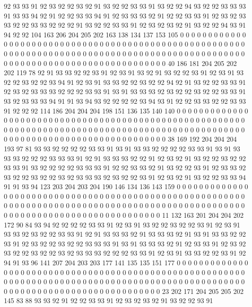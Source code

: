 92 93 93 91 92 93 92 92 93 92 91 93 92 92 93 93 91 93 92 92
94 93 92 92 93 93 93 91 93 93 94 92 91 92 92 93 93 94 91 92
93 93 93 92 91 92 92 93 93 91 92 93 92 93 93 92 92 93 93 92
92 92 91 93 92 92 93 93 91 92 93 92 93 92 91 93 92 92 94 93
91 94 92 92 104 163 206 204 205 202 163 138 134 137 153 105 0 0 0 0
0 0 0 0 0 0 0 0 0 0 0 0 0 0 0 0 0 0 0 0
0 0 0 0 0 0 0 0 0 0 0 0 0 0 0 0 0 0 0 0
0 0 0 0 0 0 0 0 0 0 0 0 0 0 0 0 0 0 0 0
0 0 0 0 0 0 0 0 0 0 0 0 0 0 0 0 0 0 0 0
0 0 0 0 0 0 0 0 0 0 0 0 0 0 0 0 0 0 0 0
0 0 0 0 0 0 0 0 0 0 0 0 0 0 0 0 0 0 0 0
0 0 0 40 186 181 204 205 202 202 119 78 92 91 93 93 92 92 93 91
92 93 91 93 92 91 93 92 92 93 91 92 93 91 93 92 92 93 92 92
93 94 91 92 93 91 93 93 92 92 93 92 92 94 92 91 93 92 92 93
93 91 92 93 92 93 93 93 92 92 92 93 93 91 93 91 93 93 93 92
93 92 92 93 92 92 93 93 91 93 92 93 93 93 94 91 91 93 94 93
92 92 92 92 93 94 93 91 92 92 93 93 92 92 93 93 91 92 92 92
114 186 204 204 204 198 151 136 135 140 140 0 0 0 0 0 0 0 0 0
0 0 0 0 0 0 0 0 0 0 0 0 0 0 0 0 0 0 0 0
0 0 0 0 0 0 0 0 0 0 0 0 0 0 0 0 0 0 0 0
0 0 0 0 0 0 0 0 0 0 0 0 0 0 0 0 0 0 0 0
0 0 0 0 0 0 0 0 0 0 0 0 0 0 0 0 0 0 0 0
0 0 0 0 0 0 0 0 0 0 0 0 0 0 0 0 0 0 0 0
0 0 0 0 0 0 0 0 0 0 0 0 0 0 0 0 0 0 0 38
169 192 204 204 204 193 97 81 93 93 92 92 92 92 93 93 91 93 91 93
93 92 92 92 92 93 93 91 93 91 93 93 93 92 92 92 93 93 93 91
92 91 93 93 93 92 92 91 92 93 92 91 93 92 92 93 92 92 93 93
91 93 92 92 92 92 93 93 93 91 92 92 93 93 92 91 93 92 92 93
91 92 93 93 92 93 92 92 93 92 92 93 92 93 93 93 92 93 92 92
93 91 92 93 92 91 93 92 92 93 93 94 91 91 93 94 123 203 204 203
204 190 146 134 136 143 159 0 0 0 0 0 0 0 0 0 0 0 0 0
0 0 0 0 0 0 0 0 0 0 0 0 0 0 0 0 0 0 0 0
0 0 0 0 0 0 0 0 0 0 0 0 0 0 0 0 0 0 0 0
0 0 0 0 0 0 0 0 0 0 0 0 0 0 0 0 0 0 0 0
0 0 0 0 0 0 0 0 0 0 0 0 0 0 0 0 0 0 0 0
0 0 0 0 0 0 0 0 0 0 0 0 0 0 0 0 0 0 0 0
0 0 0 0 0 0 0 0 0 0 0 0 0 0 11 132 163 201 204 204
202 172 90 84 93 94 92 92 92 92 93 93 91 92 93 91 93 92 92 93
92 92 93 91 92 93 91 93 93 92 93 92 92 93 93 91 92 91 93 93
93 92 91 93 93 93 92 91 93 91 93 93 92 92 93 91 92 93 92 92
93 92 92 93 93 93 91 93 91 93 93 93 92 91 92 93 93 91 92 93
92 93 92 92 93 92 92 93 92 93 93 93 92 92 92 93 93 91 92 93
91 93 93 92 92 93 91 92 94 91 93 96 141 207 204 203 203 177 141 135
135 151 177 0 0 0 0 0 0 0 0 0 0 0 0 0 0 0 0 0
0 0 0 0 0 0 0 0 0 0 0 0 0 0 0 0 0 0 0 0
0 0 0 0 0 0 0 0 0 0 0 0 0 0 0 0 0 0 0 0
0 0 0 0 0 0 0 0 0 0 0 0 0 0 0 0 0 0 0 0
0 0 0 0 0 0 0 0 0 0 0 0 0 0 0 0 0 0 0 0
0 0 0 0 0 0 0 0 0 0 0 0 0 0 0 0 0 0 0 0
0 0 0 0 0 0 0 0 0 0 23 202 171 204 205 205 202 145 83 88
93 93 92 91 92 92 93 93 91 92 93 92 93 92 91 93 92 92 93 91
